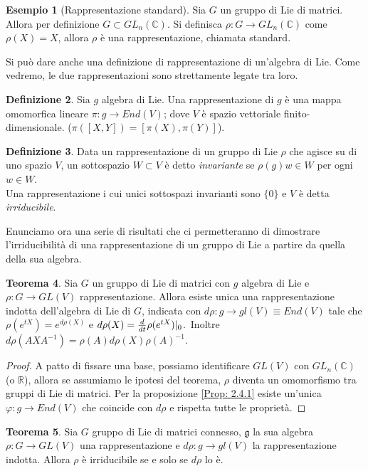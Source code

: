 \documentclass[12pt,a4paper]{report}
\theoremstyle{definition}
\newtheorem{Def}{Definizione}[chapter]
\newtheorem{Theo}[Def]{Teorema}
\theoremstyle{definition}
\newtheorem{Ex}[Def]{Esempio}
\theoremstyle{definition}
\theoremstyle{definition}
\begin{document}
\begin{Ex}[Rappresentazione standard]
	Sia $G$ un gruppo di Lie di matrici. Allora per definizione $G\subset GL_n(\mathbb{C})$. Si definisca $\rho: G\rightarrow GL_n(\mathbb{C})$ come $\rho(X)=X$, allora $\rho$ è una rappresentazione, chiamata standard. 
\end{Ex}
Si può dare anche una definizione di rappresentazione di un'algebra di Lie. Come vedremo, le due rappresentazioni sono strettamente legate tra loro.
\begin{Def}
	Sia $g$ algebra di Lie. Una rappresentazione di $g$ è una mappa omomorfica lineare $\pi:g\rightarrow End(V)$; dove $V$ è spazio vettoriale finito-dimensionale. ($\pi([X,Y])=[\pi(X),\pi(Y)]$).
\end{Def}

\begin{Def}
	Data un rappresentazione di un gruppo di Lie $\rho$ che agisce su di uno spazio $V$, un sottospazio $W\subset V$ è detto \textit{invariante} se $\rho(g)w\in W$ per ogni $w\in W$.\\
	Una rappresentazione i cui unici sottospazi invarianti sono $\{0\}$ e $V$ è detta \textit{irriducibile}.
\end{Def}
Enunciamo ora una serie di risultati che ci permetteranno di dimostrare l'irriducibilità di una rappresentazione di un gruppo di Lie a partire da quella della sua algebra.
\begin{Theo}
	Sia $G$ un gruppo di Lie di matrici con $g$ algebra di Lie e $\rho:G\rightarrow GL(V)$ rappresentazione. Allora esiste unica una rappresentazione indotta dell'algebra di Lie di $G$, indicata con $d\rho:g\rightarrow gl(V)\equiv End(V)$ tale che $\rho(e^{tX})=e^{d\rho(X)}$ e $d\rho(X)={d\over dt}\rho(e^{tX})|_0$.\
	Inoltre $d\rho(AXA^{-1})=\rho(A)d\rho(X)\rho(A)^{-1}$.	
\end{Theo}
\begin{proof}
	A patto di fissare una base, possiamo identificare $GL(V)$ con $GL_n(\mathbb{C})$ (o $\mathbb{R}$), allora se assumiamo le ipotesi del teorema, $\rho$ diventa un omomorfismo tra gruppi di Lie di matrici. Per la proposizione \ref{Prop: 2.4.1} esiste un'unica $\varphi:g\rightarrow End(V)$ che coincide con $d\rho$ e rispetta tutte le proprietà.
\end{proof}
\begin{Theo}\label{Theo: 3.1}
	Sia $G$ gruppo di Lie di matrici connesso, $\mathfrak{g}$ la sua algebra $\rho:G\rightarrow GL(V)$ una rappresentazione e $d\rho:g\rightarrow gl(V)$ la rappresentazione indotta. Allora $\rho$ è irriducibile se e solo se $d\rho$ lo è.
\end{Theo}
\end{document}
